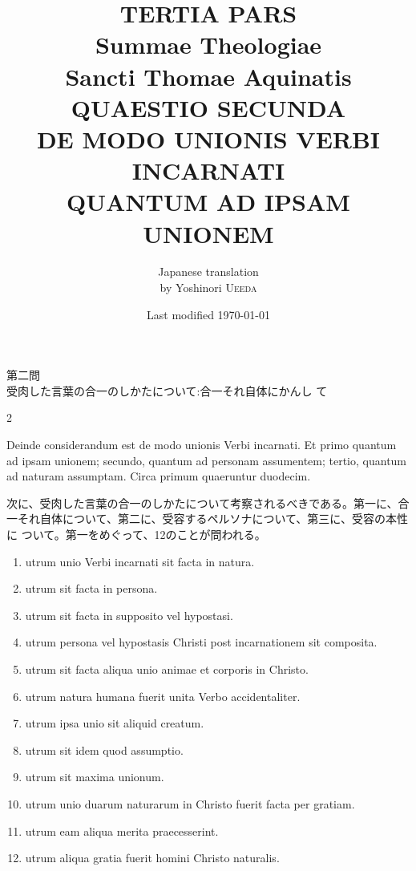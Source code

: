 \documentclass[paper=a4paper,fontsize=10pt,jafontsize=9pt,titlepage]{jlreq}
\title{{\bfseries TERTIA PARS}\\{\Huge Summae Theologiae}\\Sancti Thomae
Aquinatis\\{\sffamily QUAESTIO SECUNDA}\\DE MODO UNIONIS VERBI
INCARNATI\\QUANTUM AD IPSAM UNIONEM}
\author{Japanese translation\\by Yoshinori {\scshape Ueeda}}
\date{Last modified \today}
\begin{document}
\maketitle
\pagestyle{fancy}

\begin{center}
{\Large 第二問\\受肉した言葉の合一のしかたについて:合一それ自体にかんし
 て}
\end{center}
\newpage

\begin{paracol}{2}

Deinde considerandum est de modo unionis Verbi incarnati. Et primo
 quantum ad ipsam unionem; secundo, quantum ad personam assumentem;
 tertio, quantum ad naturam assumptam. Circa primum quaeruntur
 duodecim.

\switchcolumn

次に、受肉した言葉の合一のしかたについて考察されるべきである。第一に、合
 一それ自体について、第二に、受容するペルソナについて、第三に、受容の本性に
 ついて。第一をめぐって、12のことが問われる。

\switchcolumn*

\begin{enumerate}
 \item utrum unio Verbi incarnati sit facta in natura.
 \item utrum sit facta in persona.
 \item utrum sit facta in supposito vel hypostasi.
 \item utrum persona vel hypostasis Christi post incarnationem sit
       composita.
 \item utrum sit facta aliqua unio animae et corporis in Christo.
 \item utrum natura humana fuerit unita Verbo accidentaliter.
 \item utrum ipsa unio sit aliquid creatum.
 \item utrum sit idem quod assumptio.
 \item utrum sit maxima unionum.
 \item utrum unio duarum naturarum in Christo fuerit facta per gratiam.
 \item utrum eam aliqua merita praecesserint.
 \item utrum aliqua gratia fuerit homini Christo naturalis.
\end{enumerate}

\switchcolumn


\end{paracol}
\end{document}
